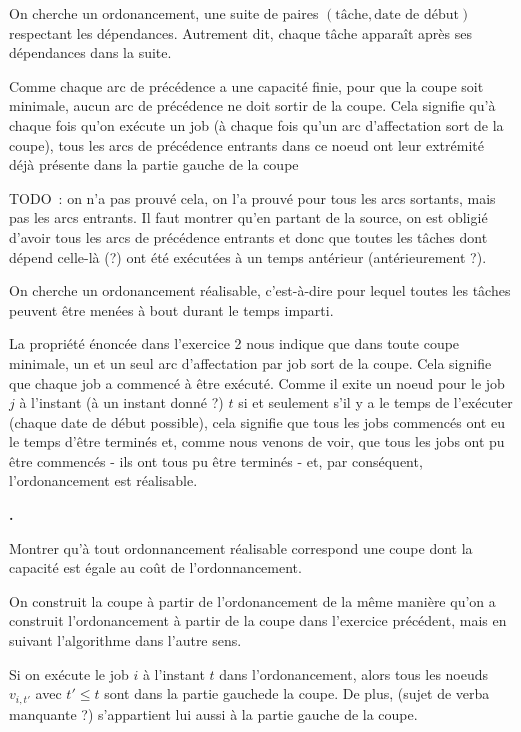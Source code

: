\documentclass{article}
\newcounter{enoncecount}
\newenvironment{enonce}
{%
\stepcounter{enoncecount}
\bf\small \arabic{enoncecount}.
\begin{bf}
}
{%
\end{bf}
}
\begin{document}
On cherche un ordonancement, une suite de paires
$(\text{tâche},\text{date de début})$ respectant les dépendances. 
Autrement dit, chaque tâche apparaît après ses dépendances dans la
suite.

Comme chaque arc de précédence a une capacité finie, pour que la coupe
soit minimale, aucun arc de précédence ne doit sortir de la
coupe. Cela signifie qu'à chaque fois qu'on exécute un job (à
chaque fois qu'un arc d'affectation sort de la coupe), tous les arcs
de précédence entrants dans ce noeud ont leur extrémité déjà présente
dans la partie \og gauche \fg de la coupe 

TODO~: on n'a pas prouvé
cela, on l'a prouvé pour tous les arcs sortants, mais pas les arcs entrants. Il faut
montrer qu'en partant de la source, on est obligié d'avoir tous les
arcs de précédence entrants et donc que toutes les tâches dont dépend
celle-là (?) ont été exécutées à un temps antérieur (antérieurement ?).

On cherche un ordonancement réalisable, c'est-à-dire pour lequel
toutes les tâches peuvent être menées à bout durant le temps
imparti.

La propriété énoncée dans l'exercice 2 nous indique que dans toute
coupe minimale, un et un seul arc d'affectation par job sort de la
coupe. Cela signifie que chaque job a commencé à être exécuté. Comme
il exite un noeud pour le job $j$ à l'instant (à un instant donné ?) $t$ si et seulement s'il
y a le temps de l'exécuter ( chaque date de début possible\fg),
cela signifie que tous les jobs commencés ont eu le temps d'être
terminés et, comme nous venons de voir, que tous les jobs ont pu être
commencés - ils ont tous pu être terminés - et, par conséquent, l'ordonancement est
réalisable.

\begin{enonce}
Montrer qu'à tout ordonnancement réalisable correspond une coupe dont la capacité est égale au coût de l'ordonnancement.
\end{enonce}

On construit la coupe à partir de l'ordonancement de la même manière
qu'on a construit l'ordonancement à partir de la coupe dans l'exercice
précédent, mais en suivant l'algorithme dans l'autre sens.

Si on exécute le job $i$ à l'instant $t$ dans l'ordonancement, alors
tous les noeuds $v_{i,t'}$ avec $t' \leq t$ sont dans la partie \og
gauche\fg de la coupe. De plus, (sujet de verba manquante ?) s'appartient lui aussi à la partie
gauche de la coupe.
\end{document}
